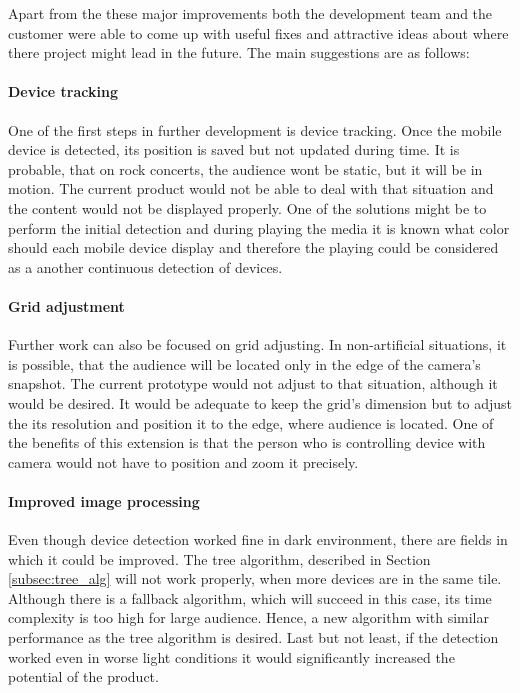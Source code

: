 Apart from the these major improvements both the development team and the customer were able to come up with useful fixes and attractive ideas about where there project might lead in the future. The main suggestions are as follows:

\paragraph{Device tracking}
One of the first steps in further development is device tracking.
Once the mobile device is detected, its position is saved but not updated during time.
It is probable, that on rock concerts, the audience wont be static, but it will be in motion.
The current product would not be able to deal with that situation and the content would not be displayed properly.
One of the solutions might be to perform the initial detection and during playing the media it is known what color should each mobile device display and therefore the playing could be considered as a another continuous detection of devices.

\paragraph{Grid adjustment}
Further work can also be focused on grid adjusting.
In non-artificial situations, it is possible, that the audience will be located only in the edge of the camera's snapshot.
The current prototype would not adjust to that situation, although it would be desired.
It would be adequate to keep the grid's dimension but to adjust the its resolution and position it to the edge, where audience is located.
One of the benefits of this extension is that the person who is controlling device with camera would not have to position and zoom it precisely.

\paragraph{Improved image processing}
Even though device detection worked fine in dark environment, there are fields in which it could be improved.
The tree algorithm, described in Section \ref{subsec:tree_alg} will not work properly, when more devices are in the same tile.
Although there is a fallback algorithm, which will succeed in this case, its time complexity is too high for large audience.
Hence, a new algorithm with similar performance as the tree algorithm is desired.
Last but not least, if the detection worked even in worse light conditions it would significantly increased the potential of the product.

